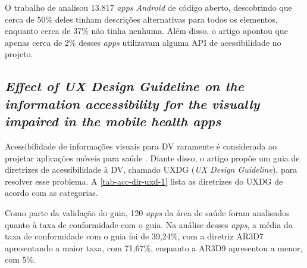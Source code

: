 O trabalho de  analisou 13.817 \emph{apps Android} de código aberto, descobrindo que cerca de 50\% deles tinham descrições alternativas para todos os elementos, enquanto cerca de 37\% não tinha nenhuma.
Além disso, o artigo apontou que apenas cerca de 2\% desses \emph{apps} utilizavam alguma API de acessibilidade no projeto.

\subsection{\emph{Effect of UX Design Guideline on the information accessibility for the visually impaired in the mobile health apps}}

Acessibilidade de informações visuais para DV raramente é considerada ao projetar aplicações móveis para saúde \cite{Kim20191103}.
Diante disso, o artigo propõe um guia de diretrizes de acessibilidade à DV, chamado UXDG (\emph{UX Design Guideline}), para resolver esse problema.
A \autoref{tab-acc-dir-uxd-1} lista as diretrizes do UXDG de acordo com as categorias.

Como parte da validação do guia, 120 \emph{apps} da área de saúde foram analisados quanto à taxa de conformidade com o guia.
Na análise desses \emph{apps}, a média da taxa de conformidade com o guia foi de 39,24\%, com a diretriz AR3D7 apresentando
a maior taxa, com 71,67\%, enquanto a AR3D9 apresentou a menor, com 5\%.

